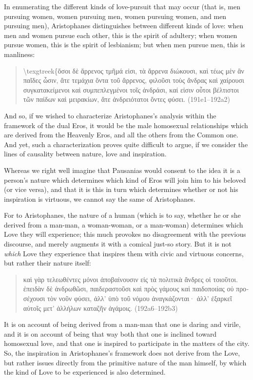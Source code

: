 In enumerating the different kinds of love-pursuit that may occur (that
is, men pursuing women, women pursuing men, women pursuing women, and
men pursuing men), Aristophanes distinguishes between different kinds of
love: when men and women pursue each other, this is the spirit of
adultery; when women pursue women, this is the spirit of lesbianism; but
when men pursue men, this is manliness:

\begin{quote}
\textbackslash{}texgtreek\{ὅσοι δὲ ἄρρενος τμῆμά εἰσι, τὰ ἄρρενα
διώκουσι, καὶ τέως μὲν ἂν παῖδες ὦσιν, ἅτε τεμάχια ὄντα τοῦ ἄρρενος,
φιλοῦσι τοὺς ἄνδρας καὶ χαίρουσι συγκατακείμενοι καὶ συμπεπλεγμένοι τοῖς
ἀνδράσι, καί εἰσιν οὗτοι βέλτιστοι τῶν παίδων καὶ μειρακίων, ἅτε
ἀνδρειότατοι ὄντες φύσει. (191e1--192a2)
\end{quote}

And so, if we wished to characterize Aristophanes's analysis within the
framework of the dual Eros, it would be the male homosexual
relationships which are derived from the Heavenly Eros, and all the
others from the Common one. And yet, such a characterization proves
quite difficult to argue, if we consider the lines of causality between
nature, love and inspiration.

Whereas we right well imagine that Pausanias would consent to the idea
it is a person's nature which determines which kind of Eros will join
him to his beloved (or vice versa), and that it is this in turn which
determines whether or not his inspiration is virtuous, we cannot say the
same of Aristophanes.

For to Aristophanes, the nature of a human (which is to say, whether he
or she derived from a man-man, a woman-woman, or a man-woman) determines
which Love they will experience; this much provokes no disagreement with
the previous discourse, and merely augments it with a comical just-so
story. But it is not \emph{which} Love they experience that inspires
them with civic and virtuous concerns, but rather their nature itself:

\begin{quote}
\textgreek{καὶ γὰρ τελεωθέντες μόνοι ἀποβαίνουσιν εἰς τὰ πολιτικὰ ἄνδρες οἱ
τοιοῦτοι. ἐπειδὰν δὲ ἀνδρωθῶσι, παιδεραστοῦσι καὶ πρὸς γάμους καὶ
παιδοποιίας οὐ προσέχουσι τὸν νοῦν φύσει, ἀλλ' ὑπὸ τοῦ νόμου
ἀναγκάζονται· ἀλλ' ἐξαρκεῖ αὐτοῖς μετ' ἀλλήλων καταζῆν ἀγάμοις.}
(192a6--192b3)
\end{quote}

It is on account of being derived from a man-man that one is daring and
virile, and it is on account of being that way both that one is inclined
toward homosexual love, and that one is inspired to participate in the
matters of the city. So, the inspiration in Aristophanes's framework
does not derive from the Love, but rather issues directly from the
primitive nature of the man himself, by which the kind of Love to be
experienced is also determined.

